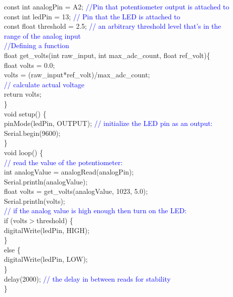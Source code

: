 \documentclass[12pt,a4paper]{article}
\begin{document}
const int analogPin = A2; \textcolor{blue}{ //Pin that potentiometer output is attached to}\\
const int ledPin = 13;  \textcolor{blue}{ // Pin that the LED is attached to}\\
const float threshold = 2.5;  \textcolor{blue}{  // an arbitrary threshold level that's in the \\range of the analog input}\\
 \textcolor{blue}{//Defining a function}\\[9pt]
float get\_volts(int raw\_input, int max\_adc\_count,  float ref\_volt)\{\\
    float volts = 0.0;\\
    volts = (raw\_input*ref\_volt)/max\_adc\_count; \\ \textcolor{blue}{ // calculate actual voltage}\\
return volts;\\
\}\\[9pt]
void setup() \{\\
  pinMode(ledPin, OUTPUT);  \textcolor{blue}{// initialize the LED pin as an output:}\\
  Serial.begin(9600);\\
\}\\[9pt]
void loop() \{\\
   \textcolor{blue}{// read the value of the potentiometer:}\\
  int analogValue = analogRead(analogPin); \\
  Serial.println(analogValue);\\
  float volts = get\_volts(analogValue, 1023, 5.0); \\
  Serial.println(volts); \\
   \textcolor{blue}{//  if the analog value is high enough then turn on the LED:}\\
  if (volts$ > $threshold) \{\\
    digitalWrite(ledPin, HIGH);\\
  \} \\
  else \{\\
    digitalWrite(ledPin, LOW);\\
  \}\\  
  delay(2000);  \textcolor{blue}{// the delay in between reads for stability}\\
\}\\

\vspace{10cm}
\end{document}
